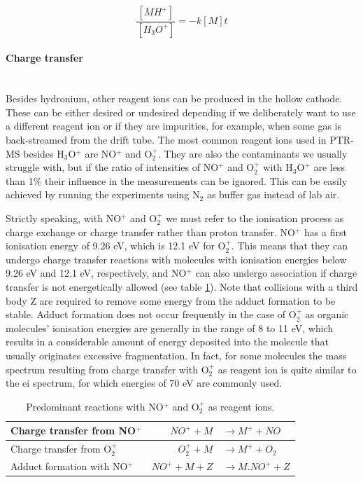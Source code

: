 \begin{equation}
\label{eq:k3}
\frac{[MH^+]}{[H_3O^+]} = -k[M]t
\end{equation}




\paragraph{Charge transfer}~\\
Besides hydronium, other reagent ions can be produced in the hollow cathode. These can be either desired or undesired depending if we deliberately want to use a different reagent ion or if they are impurities, for example, when some gas is back-streamed from the drift tube. The most common reagent ions used in PTR-MS besides H$_3$O$^+$ are NO$^+$ and O$_2^+$. They are also the contaminants we usually struggle with, but if the ratio of intensities of NO$^+$ and O$_2^+$ with H$_3$O$^+$ are less than 1\% their influence in the measurements can be ignored. This can be easily achieved by running the experiments using N$_2$ as buffer gas instead of lab air.

Strictly speaking, with NO$^+$ and O$_2^+$ we must refer to the ionisation process as charge exchange or charge transfer rather than proton transfer. NO$^+$ has a first ionisation energy of 9.26 eV, which is 12.1 eV for O$_2^+$. This means that they can undergo charge transfer reactions with molecules with ionisation energies below 9.26 eV and 12.1 eV, respectively, and NO$^+$ can also undergo association  if charge transfer is not energetically allowed (see table \ref{tb:ct}). Note that collisions with a third body  Z   are required to remove some energy from the adduct formation to be stable. Adduct formation does not occur frequently in the case of O$_2^+$ as organic molecules' ionisation energies are generally in the range of 8 to 11 eV, which results in a considerable amount of energy deposited into the molecule that usually originates excessive fragmentation. In fact, for some molecules the mass spectrum resulting from charge transfer with O$_2^+$ as reagent ion is quite similar to the \acrshort{ei} spectrum, for which energies of 70 eV are commonly used. 

\begin{table}[ht]
\centering
\caption{Predominant reactions with NO$^+$ and O$_2^+$ as reagent ions.}
\label{tb:ct}
\begin{tabular}{l rl}
\toprule
Charge transfer from NO$^+$ & $NO^+ + M$&$\rightarrow M^+ + NO$
\\ \midrule 
Charge transfer from O$_2^+$ & $O_2^+ + M$&$\rightarrow M^+ + O_2$
\\ \midrule
Adduct formation with NO$^+$ & $NO^+ + M + Z$&$\rightarrow M.NO^+ + Z$  
\\ \bottomrule
\end{tabular}
\end{table}


